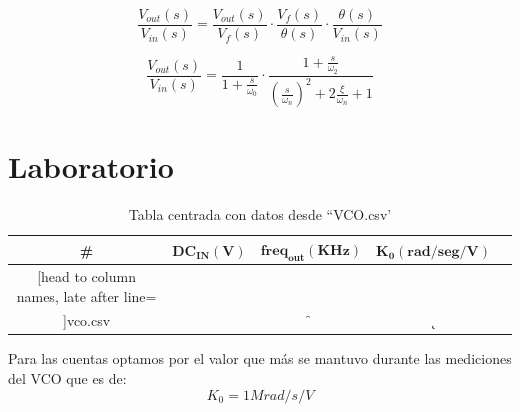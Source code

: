 \documentclass{article}
\begin{document}
\begin{equation} \label{voutvin_eqn}
\frac{V_{out}(s)}{V_{in}(s)} = \frac{V_{out}(s)}{V_f(s)} \cdot \frac{V_f(s)}{\theta(s)}\cdot \frac{\theta(s)}{V_{in}(s)}
\end{equation}

\begin{equation} \label{voutvin_eqn_posta}
\frac{V_{out}(s)}{V_{in}(s)} = \frac{1}{ 1 + \frac{s}{\omega_0}} 
\cdot \frac{ 1 + \frac{s}{\omega_2} }
{ \left(\frac{s}{\omega_n}\right)^2 + 2\frac{\xi}{\omega_n}  + 1} 
\end{equation}


\section*{Laboratorio}

\begin{table}[h!]
	\centering
	\caption{Tabla centrada con datos desde ``VCO.csv'}
	\label{table7}
	\begin{tabular}{c c c c c}%
		\bfseries \# & $\bm{DC_{IN}(V)}$ & $\bm{freq_{out}(KHz)}$ & $\bm{K_0(rad/seg/V)}$  \\ \hline
		\csvreader[head to column names, late after line=\\]{vco.csv}{}{\thecsvrow & \dc & \f & \k}
		\hline
	\end{tabular}
\end{table}
Para las cuentas optamos por el valor que más se mantuvo durante las mediciones del VCO que es de:
\[ K_0= 1Mrad/s/V \]
\end{document}

